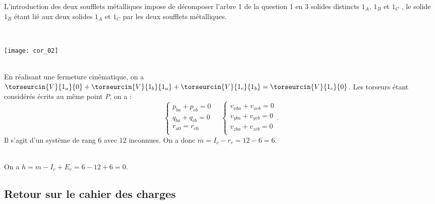 \begin{multicols}{2}
L’introduction des deux soufflets métalliques impose de décomposer l’arbre 1 de la question 1 en 3 solides distincts $1_A$, $1_B$ et $1_C$ , le solide $1_B$ étant lié aux deux solides $1_A$ et $1_C$ par les deux soufflets métalliques.

\fi


\ifprof
\begin{corrige} ~\\

\begin{center}
\texttt{[image: cor\_02]}
\end{center}

\end{corrige}
\else
\fi


\ifprof
\begin{corrige} ~\\
En réalisant une fermeture cinématique, on a $\torseurcin{V}{1_a}{0}+\torseurcin{V}{1_b}{1_a}+\torseurcin{V}{1_c}{1_b}=\torseurcin{V}{1_c}{0}$. 
Les torseurs étant considérés écrits au même point $P$, on a : 
$$
\left\{ 
\begin{array}{l}
p_{ba}+p_{cb}=0 \\
q_{ba}+q_{cb}=0 \\
r_{a0}=r_{c0}\\
\end{array}
\right. 
\quad
\left\{ 
\begin{array}{l}
v_{xba} + v_{xcb}=0\\
v_{yba} + v_{ycb}=0\\
v_{zba} + v_{zcb}=0\\
\end{array}
\right. .
$$
Il s'agit d'un système de rang 6 avec 12 inconnues. On a donc $m=I_c-r_c=12-6=6$.
\end{corrige}
\else
\fi


\ifprof
\begin{corrige} ~\\
On a $h=m-I_c+E_c = 6-12+6 = 0$.
\end{corrige}
\else
\fi



\subsection*{Retour sur le cahier des charges}




\end{multicols}
